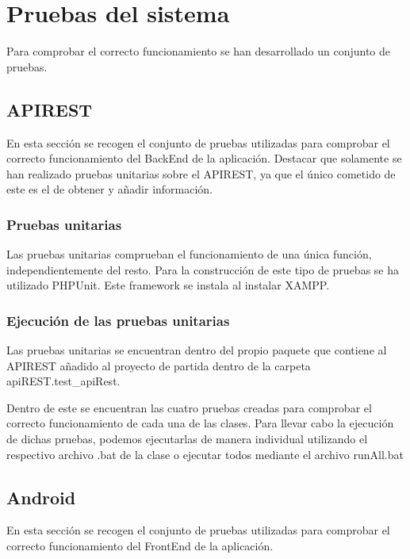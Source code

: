 \section{Pruebas del sistema}

Para comprobar el correcto funcionamiento se han desarrollado un conjunto de pruebas.

\subsection{APIREST}
En esta sección se recogen el conjunto de pruebas utilizadas para comprobar el correcto funcionamiento del BackEnd de la aplicación. Destacar que solamente se han realizado pruebas unitarias sobre el APIREST, ya que el único cometido de este es el de obtener y añadir información.

\subsubsection{Pruebas unitarias}

Las pruebas unitarias comprueban el funcionamiento de una única función, independientemente del resto. Para la construcción de este tipo de pruebas se ha utilizado PHPUnit. Este framework se instala al instalar XAMPP.

\subsubsection{Ejecución de las pruebas unitarias}

Las pruebas unitarias se encuentran dentro del propio paquete que contiene al APIREST añadido al proyecto de partida dentro de la carpeta apiREST.test\_apiRest. 


Dentro de este se encuentran las cuatro pruebas creadas para comprobar el correcto funcionamiento de cada una de las clases. Para llevar cabo la ejecución de dichas pruebas, podemos ejecutarlas de manera individual utilizando el respectivo archivo .bat de la clase  o ejecutar todos mediante el archivo runAll.bat

\subsection{Android}

En esta sección se recogen el conjunto de pruebas utilizadas para comprobar el correcto funcionamiento del FrontEnd de la aplicación.

